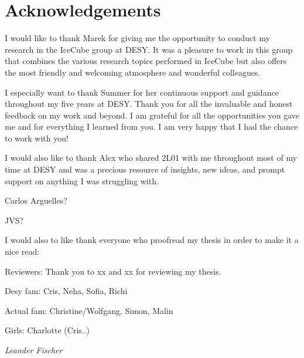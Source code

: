 \chapter*{Acknowledgements}
I would like to thank Marek for giving me the opportunity to conduct my research in the IceCube group at DESY. It was a pleasure to work in this group that combines the various research topics performed in IceCube but also offers the most friendly and welcoming atmosphere and wonderful colleagues.

I especially want to thank Summer for her continuous support and guidance throughout my five years at DESY. Thank you for all the invaluable and honest feedback on my work and beyond. I am grateful for all the opportunities you gave me and for everything I learned from you. I am very happy that I had the chance to work with you!

I would also like to thank Alex who shared 2L01 with me throughout most of my time at DESY and was a precious resource of insights, new ideas, and prompt support on anything I was struggling with.

Carlos Arguelles?

JVS?

I would also to like thank everyone who proofread my thesis in order to make it a nice read: 


Reviewers:
Thank you to xx and xx for reviewing my thesis.


Desy fam:
Cris, Neha, Sofia, Richi


Actual fam:
Christine/Wolfgang, Simon, Malin

Girls:
Charlotte (Cris..)


\begin{flushright}
	\textit{Leander Fischer}
\end{flushright}